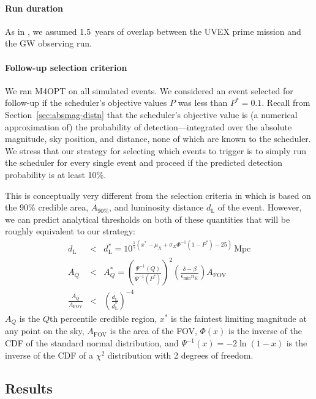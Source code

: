 \documentclass[twocolumn,times]{aastex631}
\begin{document}
\paragraph{Run duration}
As in \citet{criswell}, we assumed 1.5~years of overlap between the \ac{UVEX} prime mission and the \ac{GW} observing run.

\paragraph{Follow-up selection criterion}
We ran \ac{M4OPT} on all simulated events. We considered an event selected for follow-up if the scheduler's objective values $P$ was less than $P^* = 0.1$. Recall from Section~\ref{sec:absmag-distn} that the scheduler's objective value is (a numerical approximation of) the probability of detection---integrated over the absolute magnitude, sky position, and distance, none of which are known to the scheduler. We stress that our strategy for selecting which events to trigger is to simply run the scheduler for every single event and proceed if the predicted detection probability is at least 10\%.

This is conceptually very different from the selection criteria in \citet{criswell} which is based on the 90\% credible area, $A_\mathrm{90\%}$, and luminosity distance $d_\mathrm{L}$ of the event. However, we can predict analytical thresholds on both of these quantities that will be roughly equivalent to our strategy:
%
\begin{eqnarray}
    d_\mathrm{L} &<& d_\mathrm{L}^* = 10^{\frac{1}{5}(x^* - \mu_X + \sigma_X \Phi^{-1}(1-P^*) - 25)}\,\mathrm{Mpc} \label{eq:threshold-distance} \\
    A_Q &<& A_Q^* = \left(\frac{\Psi^{-1}(Q)}{\Psi^{-1}(P^*)}\right)^2 \left(\frac{\delta - \beta}{\epsilon_\mathrm{min} n_K}\right)A_\mathrm{FOV} \label{eq:threshold-area} \\
    \frac{A_Q}{A_\mathrm{FOV}} &<& \left(\frac{d_\mathrm{L}}{d_\mathrm{L}^*}\right)^{-4} \label{eq:threshold-area-distance}
\end{eqnarray}
%
$A_Q$ is the $Q$th percentile credible region, $x^*$ is the faintest limiting magnitude at any point on the sky, $A_\mathrm{FOV}$ is the area of the \ac{FOV}, $\Phi(x)$ is the inverse of the \ac{CDF} of the standard normal distribution, and $\Psi^{-1}(x) = -2\ln(1 - x)$ is the inverse of the \ac{CDF} of a $\chi^2$ distribution with 2 degrees of freedom.

\subsection{Results}
\end{document}
